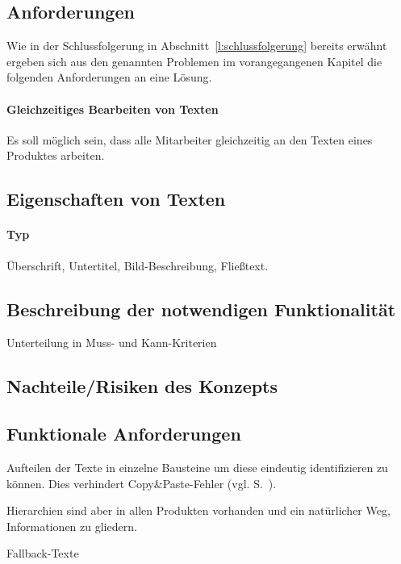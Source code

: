\subsection{Anforderungen}\label{l:anforderungen}

Wie in der Schlussfolgerung in Abschnitt~\ref{l:schlussfolgerung} bereits erwähnt ergeben sich aus den genannten Problemen im vorangegangenen Kapitel die folgenden Anforderungen an eine Lösung.

\paragraph{Gleichzeitiges Bearbeiten von Texten} Es soll möglich sein, dass alle  Mitarbeiter gleichzeitig an den Texten eines Produktes arbeiten.



\subsection{Eigenschaften von Texten}
\label{l:textattribute}

\paragraph{Typ} Überschrift, Untertitel, Bild-Beschreibung, Fließtext.

\subsection{Beschreibung der notwendigen Funktionalität}

Unterteilung in Muss- und Kann-Kriterien

\subsection{Nachteile/Risiken des Konzepts}

\subsection{Funktionale Anforderungen}


\TODO

Aufteilen der Texte in einzelne Bausteine um diese eindeutig identifizieren zu können. Dies verhindert Copy\&Paste-Fehler (vgl. S.~\pageref{p:serielles-konzept}).

\label{l:hierarchien} Hierarchien sind aber in allen Produkten vorhanden und ein natürlicher Weg, Informationen zu gliedern. 

Fallback-Texte
